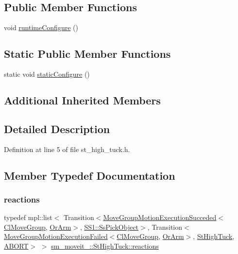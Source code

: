 \subsection*{Public Member Functions}
\begin{DoxyCompactItemize}
\item 
void \hyperlink{structsm__moveit__3_1_1StHighTuck_a9a247958dbc1a1ab3ef0a287f6688218}{runtime\+Configure} ()
\end{DoxyCompactItemize}
\subsection*{Static Public Member Functions}
\begin{DoxyCompactItemize}
\item 
static void \hyperlink{structsm__moveit__3_1_1StHighTuck_aec8c3461ff25307361fed9e292e2a00d}{static\+Configure} ()
\end{DoxyCompactItemize}
\subsection*{Additional Inherited Members}


\subsection{Detailed Description}


Definition at line 5 of file st\+\_\+high\+\_\+tuck.\+h.



\subsection{Member Typedef Documentation}
\mbox{\label{structsm__moveit__3_1_1StHighTuck_a14e727ee48019a59fb9f27737fb57a7e}} 
\subsubsection{\texorpdfstring{reactions}{reactions}}
{\footnotesize\ttfamily typedef mpl\+::list$<$ Transition$<$\hyperlink{structmoveit__z__client_1_1MoveGroupMotionExecutionSucceded}{Move\+Group\+Motion\+Execution\+Succeded}$<$\hyperlink{classmoveit__z__client_1_1ClMoveGroup}{Cl\+Move\+Group}, \hyperlink{classsm__moveit__3_1_1OrArm}{Or\+Arm}$>$, \hyperlink{structsm__moveit__3_1_1SS1_1_1SsPickObject}{S\+S1\+::\+Ss\+Pick\+Object}$>$, Transition$<$\hyperlink{structmoveit__z__client_1_1MoveGroupMotionExecutionFailed}{Move\+Group\+Motion\+Execution\+Failed}$<$\hyperlink{classmoveit__z__client_1_1ClMoveGroup}{Cl\+Move\+Group}, \hyperlink{classsm__moveit__3_1_1OrArm}{Or\+Arm}$>$, \hyperlink{structsm__moveit__3_1_1StHighTuck}{St\+High\+Tuck}, \hyperlink{classABORT}{A\+B\+O\+RT}$>$ $>$ \hyperlink{structsm__moveit__3_1_1StHighTuck_a14e727ee48019a59fb9f27737fb57a7e}{sm\+\_\+moveit\+\_\+::\+St\+High\+Tuck\+::reactions}}



